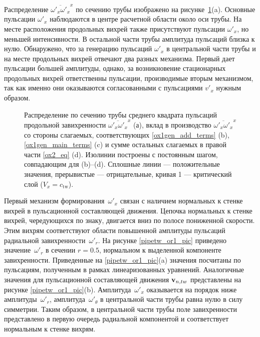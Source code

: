 Распределение $\overline{\omega'_x \omega'_x}^x$ по сечению трубы изображено на рисунке~\ref{ox1gen_pic}(a). Основные пульсации $\omega'_x$ наблюдаются в центре расчетной области около оси трубы. На месте расположения продольных вихрей также присутствуют пульсации $\omega'_x$, но меньшей интенсивности. В остальной части трубы амплитуда пульсаций близка к нулю. Обнаружено, что за генерацию пульсаций $\omega'_x$ в центральной части трубы и на месте продольных вихрей отвечают два разных механизма. Первый дает пульсации большей амплитуды, однако, за возникновение стационарных продольных вихрей ответственны пульсации, производимые вторым механизмом, так как именно они оказываются согласованными с пульсациями $v'_x$ нужным образом.


\begin{figure}
\caption{Распределение по сечению трубы среднего квадрата пульсаций продольной завихренности $\overline{\omega'_x \omega'_x }^x$ (а), вклад в производство $\overline{\omega'_x \omega'_x }^x$ со стороны слагаемых, соответствующих \eqref{ox1gen_add_terms} (b), \eqref{ox1gen_main_terms} (c) и сумме остальных слагаемых в правой части \eqref{ox2_eq} (d). Изолинии построены с постоянным шагом, совпадающим для (b)--(d). Сплошные линии --- положительные значения, прерывистые --- отрицательные, кривая 1 --- критический слой ($V_x = c_\mathrm{tw}$).}
\label{ox1gen_pic}
\end{figure}


Первый механизм формирования~$\omega'_x$ связан с наличием нормальных к стенке вихрей в пульсационной составляющей движения. Цепочка нормальных к стенке вихрей, чередующихся по знаку, двигается вниз по полосе пониженной скорости. Этим вихрям соответствуют области повышенной амплитуды пульсаций радиальной завихренности~$\omega'_r$. На рисунке \ref{pipetw_or1_pic} приведено значение~$\omega'_r$ в сечении $r = 0.5$, нормальном к выделенной компоненте завихренности. Приведенные на \ref{pipetw_or1_pic}(a) значения посчитаны по пульсациям, полученным в рамках линеаризованных уравнений. Аналогичные значения для пульсационной составляющей движения $\mathbf{v}_{n,tw}$ представлены на рисунке \ref{pipetw_or1_pic}(b). Амплитуда~$\omega'_x$ оказывается на порядок ниже амплитуды~$\omega'_r$, амплитуда~$\omega'_\theta$ в центральной части трубы равна нулю в силу симметрии. Таким образом, в центральной части трубы поле завихренности представлено в первую очередь радиальной компонентой и соответствует нормальным к стенке вихрям.

